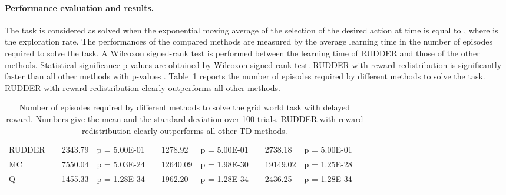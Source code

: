 \documentclass{article}
\begin{document}
\begin{appendices}
\paragraph{Performance evaluation and results.}

The task is considered as solved 
when the exponential moving average of the selection of the desired action 
at time   is equal to , where  is the exploration rate.
The performances of the compared methods are measured by the average learning time
in the number of episodes required to solve the task.
A Wilcoxon signed-rank test is performed between the learning time of RUDDER 
and those of the other methods.
Statistical significance p-values are obtained by Wilcoxon signed-rank test.
RUDDER with reward redistribution is significantly faster than all other methods with p-values . 
Table~\ref{tab:res1} reports the number of episodes required by different
methods to solve the task.  
RUDDER with reward redistribution clearly outperforms all other methods. 




\newpage
\begin{landscape}
\begin{table}[htp]
\begin{flushleft}
\caption{Number of episodes required by different 
 methods to solve the grid world task with delayed reward. Numbers give the  
 mean and the standard deviation over 100 trials.
 RUDDER with reward redistribution clearly outperforms all other TD methods.}
\label{tab:res1}\begin{tabular}{*{1}{>{\raggedright}p{6em}}*{1}{>{\columncolor{mColor1}\raggedleft}p{4em}}*{1}{>{\columncolor{mColor1}\raggedleft}p{5em}}*{1}{>{\columncolor{mColor1}\raggedright}p{5em}}*{1}{>{\raggedleft}p{4em}}*{1}{>{\raggedleft}p{5em}}*{1}{>{\raggedright}p{5em}}*{1}{>{\columncolor{mColor1}\raggedleft}p{4em}}*{1}{>{\columncolor{mColor1}\raggedleft}p{5em}}*{1}{>{\columncolor{mColor1}\raggedright}p{5em}}*{1}{>{\raggedright}p{0.01em}}}
\toprule[1pt]
\addlinespace[2pt]
{\bf Method} &\multicolumn{3}{c}{\bf Delay 10} &\multicolumn{3}{c}{\bf Delay 15} &\multicolumn{3}{c}{\bf Delay 20} &\\
\toprule[1pt]
RUDDER & 3520.06 & {\small  2343.79} & {\small p = 5.00E-01} & 3062.07 & {\small  1278.92} & {\small p = 5.00E-01} & 3813.96 & {\small  2738.18} & {\small p = 5.00E-01} &  \\
MC & 10920.64 & {\small  7550.04} & {\small p = 5.03E-24} & 17102.89 & {\small  12640.09} & {\small p = 1.98E-30} & 22910.85 & {\small  19149.02} & {\small p = 1.25E-28} &  \\
Q & 66140.76 & {\small  1455.33} & {\small p = 1.28E-34} & 115352.25 & {\small  1962.20} & {\small p = 1.28E-34} & 171571.94 & {\small  2436.25} & {\small p = 1.28E-34} &  \\
\addlinespace[1pt]


\end{tabular}
\end{flushleft}
\end{table}
\end{landscape}
\end{appendices}
\end{document}
